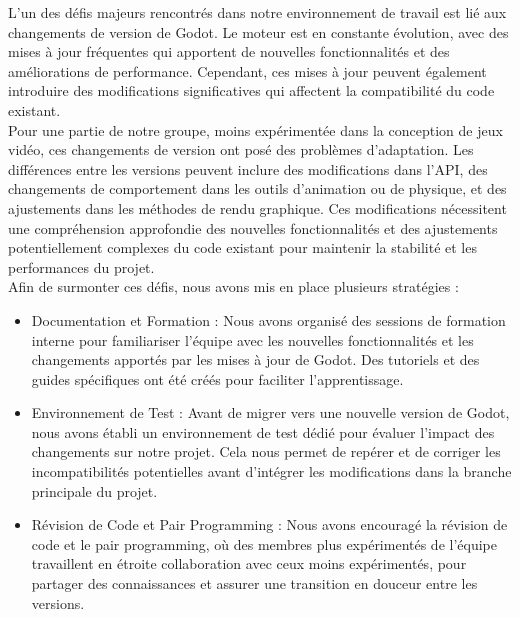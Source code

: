 L'un des défis majeurs rencontrés dans notre environnement de travail est lié aux changements de version de Godot.
Le moteur est en constante évolution, avec des mises à jour fréquentes qui apportent de nouvelles fonctionnalités et des améliorations de performance.
Cependant, ces mises à jour peuvent également introduire des modifications significatives qui affectent la compatibilité du code existant.
\\

Pour une partie de notre groupe, moins expérimentée dans la conception de jeux vidéo, ces changements de version ont posé des problèmes d'adaptation.
Les différences entre les versions peuvent inclure des modifications dans l'API, des changements de comportement dans les outils d'animation ou de physique, et des ajustements dans les méthodes de rendu graphique.
Ces modifications nécessitent une compréhension approfondie des nouvelles fonctionnalités et des ajustements potentiellement complexes du code existant pour maintenir la stabilité et les performances du projet.
\\

Afin de surmonter ces défis, nous avons mis en place plusieurs stratégies :
\\

\begin{itemize}

      \item Documentation et Formation : Nous avons organisé des sessions de formation interne pour familiariser l'équipe avec les nouvelles fonctionnalités et les changements apportés par les mises à jour de Godot.
            Des tutoriels et des guides spécifiques ont été créés pour faciliter l'apprentissage.
            \\

      \item Environnement de Test : Avant de migrer vers une nouvelle version de Godot, nous avons établi un environnement de test dédié pour évaluer l'impact des changements sur notre projet.
            Cela nous permet de repérer et de corriger les incompatibilités potentielles avant d'intégrer les modifications dans la branche principale du projet.
            \\

      \item Révision de Code et Pair Programming : Nous avons encouragé la révision de code et le pair programming, où des membres plus expérimentés de l'équipe travaillent en étroite collaboration avec ceux moins expérimentés, pour partager des connaissances et assurer une transition en douceur entre les versions.

\end{itemize}

